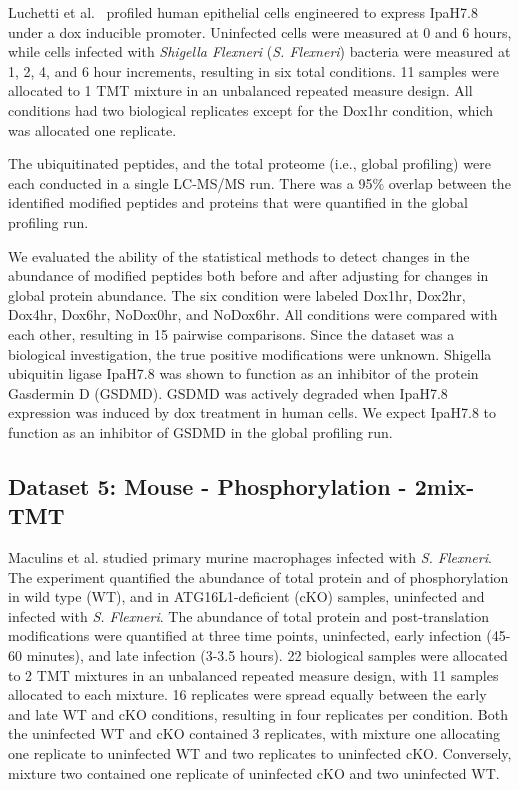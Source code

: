 \documentclass[mcp]{article}
\numberwithin{table}{section}
\begin{document}
\medskip {}  Luchetti et al.~\cite{LUCHETTI2021} profiled human epithelial cells engineered to express IpaH7.8 under a dox inducible promoter. Uninfected cells were measured at 0 and 6 hours, while cells infected with {\it Shigella Flexneri} ({\it S. Flexneri}) bacteria were measured at 1, 2, 4, and 6 hour increments, resulting in six total conditions. 11 samples were allocated to 1 TMT mixture in an unbalanced repeated measure design. All conditions had two biological replicates except for the Dox1hr condition, which was allocated one replicate.

\medskip {} The ubiquitinated peptides, and the total proteome (i.e., global profiling) were each conducted in a single LC-MS/MS run. There was a 95\% overlap between the identified modified peptides and proteins that were quantified in the global profiling run.

\medskip {} We evaluated the ability of the statistical methods to detect changes in the abundance of modified peptides both before and after adjusting for changes in global protein abundance. The six condition were labeled Dox1hr, Dox2hr, Dox4hr, Dox6hr, NoDox0hr, and NoDox6hr. All conditions were compared with each other, resulting in 15 pairwise comparisons. Since the dataset was a biological investigation, the true positive modifications were unknown. Shigella ubiquitin ligase IpaH7.8 was shown to function as an inhibitor of the protein Gasdermin D (GSDMD). GSDMD was actively degraded when IpaH7.8 expression was induced by dox treatment in human cells. We expect IpaH7.8 to function as an inhibitor of GSDMD in the global profiling run.

\subsection*{Dataset 5: Mouse - Phosphorylation - 2mix-TMT}
\label{sec:exp_proc_dataset5}


\medskip {} Maculins et al. \cite{Maculins} studied primary murine macrophages infected with {\it S. Flexneri}. The experiment quantified the abundance of total protein and of phosphorylation in wild type (WT), and in ATG16L1-deficient (cKO) samples, uninfected and infected with {\it S. Flexneri}. The abundance of total protein and post-translation modifications were quantified at three time points, uninfected, early infection (45-60 minutes), and late infection (3-3.5 hours). 22 biological samples were allocated to 2 TMT mixtures in an unbalanced repeated measure design, with 11 samples allocated to each mixture. 16 replicates were spread equally between the early and late WT and cKO conditions, resulting in four replicates per condition. Both the uninfected WT and cKO contained 3 replicates, with mixture one allocating one replicate to uninfected WT and two replicates to uninfected cKO. Conversely, mixture two contained one replicate of uninfected cKO and two uninfected WT.
\end{document}
